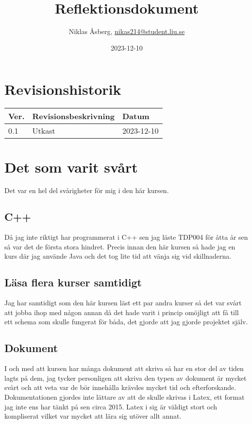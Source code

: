 \documentclass{TDP005mall}
\author{Niklas Åsberg, \url{nikas214@student.liu.se}}
\title{Reflektionsdokument}
\date{2023-12-10}
\begin{document}
\projectpage
\section{Revisionshistorik}
\begin{table}[!h]
\begin{tabularx}{\linewidth}{|l|X|l|}
\hline
Ver. & Revisionsbeskrivning & Datum \\\hline
0.1 & Utkast & 2023-12-10 \\\hline
\end{tabularx}
\end{table}

\tableofcontents
\newpage

\section{Det som varit svårt}
Det var en hel del svårigheter för mig i den här kursen. 
\subsection{C++}
Då jag inte riktigt har programmerat i C++ sen jag läste TDP004 för åtta år sen 
så var det de första stora hindret. Precis innan den här kursen så hade jag en kurs där jag använde 
Java och det tog lite tid att vänja sig vid skillnaderna. \\
\subsection{Läsa flera kurser samtidigt}
Jag har samtidigt som den här kursen läst ett par andra kurser så det var svårt 
att jobba ihop med någon annan då det hade varit i princip omöjligt att få till ett 
schema som skulle fungerat för båda, det gjorde att jag gjorde projektet själv. \\
\subsection{Dokument}
I och med att kursen har många dokument att skriva så har en stor del av tiden lagts på dem, 
jag tycker personligen att skriva den typen av dokument är mycket svårt och att veta var de 
bör innehålla krävdes mycket tid och efterforskande. Dokumentationen gjordes inte lättare av att 
de skulle skrivas i Latex, ett format jag inte ens har tänkt på sen circa 2015. Latex i sig är 
väldigt stort och kompliserat vilket var mycket att lära sig utöver allt annat. \\
\end{document}
